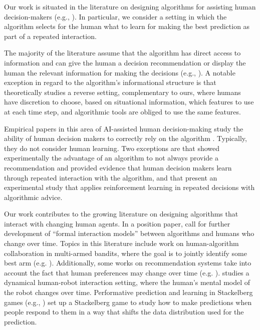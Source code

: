 
Our work is situated in the literature on designing algorithms for assisting human decision-makers (e.g., \cite{bansal2021does,greenwood2024designing,benCSCW,tschandl2020,gomez2025human, peng2024no}). 
%
In particular, we consider a setting in which the algorithm selects for the human what to learn for making the best prediction as part of a repeated interaction. 
%

The majority of the literature assume that the algorithm has direct access to %
information and can give the human a decision recommendation \cite{benFAT,albright2019} or display the human the relevant information for making the decisions (e.g., \cite{dikmen2022effects,du2022role}). A notable exception {in regard to the algorithm's informational structure} is \cite{iakovlev2024value} that theoretically studies a reverse setting, complementary to ours, where humans have discretion to choose, based on situational information, which features to use at each time step, and algorithmic tools are obliged to use the same features. 



Empirical papers in this area of AI-assisted human decision-making study the ability of human decision makers to correctly rely on the algorithm \cite{benFAT, benCSCW, albright2019, tschandl2020, buccinca2021trust, zhang2020}. Typically, they do not consider human learning.
Two exceptions are \cite{noti2023learning} that showed experimentally the advantage of an algorithm to not always provide a recommendation and provided evidence that human decision makers learn through repeated interaction with the algorithm, and  \cite{buccinca2024} that present an experimental study that applies reinforcement learning in repeated decisions with algorithmic advice. 





Our work contributes to the growing literature on designing algorithms that interact with changing human agents. 
In a position paper, \citet{dean2024accounting} call for further development of \enquote{formal interaction models} between algorithms and humans who change over time. 
%
Topics in this literature include work on human-algorithm collaboration in multi-armed bandits, where the goal is to jointly identify some best arm
(e.g. \cite{chan2019assistive, bordt2022bandit}). Additionally, some works on recommendation systems take into account the fact that human preferences may change over time (e.g. \cite{Agarwal2022DiversifiedRF, agarwal2023online}). 
\citet{tian2023towards} studies a dynamical human-robot interaction setting, where the human's mental model of the robot changes over time. 
{Performative prediction \cite{perdomo2020performative} and learning in Stackelberg games (e.g., \cite{haghtalab2024calibrated}) set up a Stackelberg game to study how to make predictions when people respond to them in a way that shifts the data distribution used for the prediction.}




